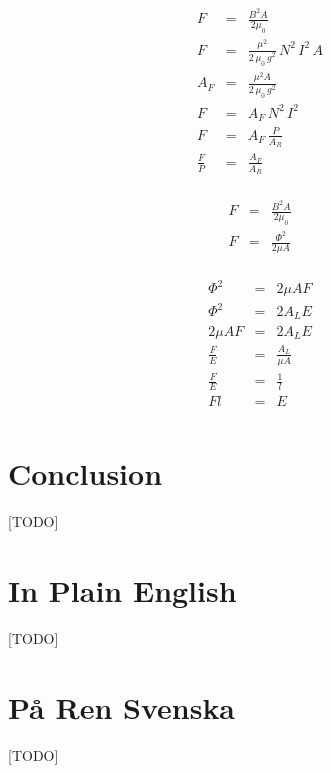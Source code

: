 \documentclass[]{../common/elementary-physics}
\begin{document}
\begin{eqnarray}
F &=& \frac{B^2 A}{2 \mu_0} \\
F &=& \frac{\mu^2}{2 \, \mu_0 \, g^2} \, N^2 \, I^2 \, A \\
A_F &=& \frac{\mu^2 A}{2 \, \mu_0 \, g^2} \\
F &=& A_F \, N^2 \, I^2 \\
F &=& A_F \, \frac{P}{A_R} \\
\frac{F}{P} &=& \frac{A_F}{A_R} \\
\end{eqnarray}

\begin{eqnarray}
F &=& \frac{B^2 A}{2 \mu_0} \\
F &=& \frac{{\Phi}^2}{2 \mu A} \\
\end{eqnarray}

\begin{eqnarray}
{\Phi}^2 &=& 2 \mu A F \\
{\Phi}^2 &=& 2 A_L E \\
2 \mu A F &=& 2 A_L E \\
\frac{F}{E} &=& \frac{A_L}{\mu A} \\
\frac{F}{E} &=& \frac{1}{l} \\
F l &=& E \\
\end{eqnarray}

\section{Conclusion}

[TODO]

\appendix

\section{In Plain English}

[TODO]

\section{På Ren Svenska}

[TODO]



\printbibliography
\end{document}
